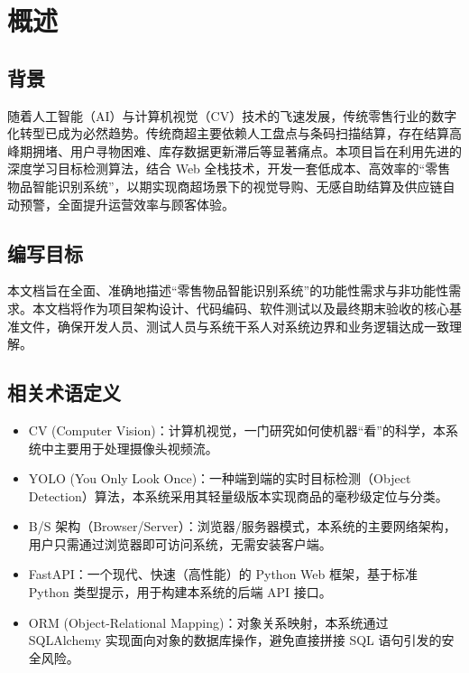 
\setcounter{section}{0}
\renewcommand{\thesection}{\arabic{section}}
\renewcommand{\thesubsection}{\thesection.\arabic{subsection}}
\renewcommand{\thesubsubsection}{\thesubsection.\arabic{subsubsection}}

\section{概述}

\subsection{背景}
随着人工智能（AI）与计算机视觉（CV）技术的飞速发展，传统零售行业的数字化转型已成为必然趋势。传统商超主要依赖人工盘点与条码扫描结算，存在结算高峰期拥堵、用户寻物困难、库存数据更新滞后等显著痛点。本项目旨在利用先进的深度学习目标检测算法，结合 Web 全栈技术，开发一套低成本、高效率的“零售物品智能识别系统”，以期实现商超场景下的视觉导购、无感自助结算及供应链自动预警，全面提升运营效率与顾客体验。

\subsection{编写目标}
本文档旨在全面、准确地描述“零售物品智能识别系统”的功能性需求与非功能性需求。本文档将作为项目架构设计、代码编码、软件测试以及最终期末验收的核心基准文件，确保开发人员、测试人员与系统干系人对系统边界和业务逻辑达成一致理解。

\subsection{相关术语定义}
\begin{itemize}[leftmargin=2em]
  \item CV (Computer Vision)：计算机视觉，一门研究如何使机器“看”的科学，本系统中主要用于处理摄像头视频流。
  \item YOLO (You Only Look Once)：一种端到端的实时目标检测（Object Detection）算法，本系统采用其轻量级版本实现商品的毫秒级定位与分类。
  \item B/S 架构（Browser/Server）：浏览器/服务器模式，本系统的主要网络架构，用户只需通过浏览器即可访问系统，无需安装客户端。
  \item FastAPI：一个现代、快速（高性能）的 Python Web 框架，基于标准 Python 类型提示，用于构建本系统的后端 API 接口。
  \item ORM (Object-Relational Mapping)：对象关系映射，本系统通过 SQLAlchemy 实现面向对象的数据库操作，避免直接拼接 SQL 语句引发的安全风险。
\end{itemize}

